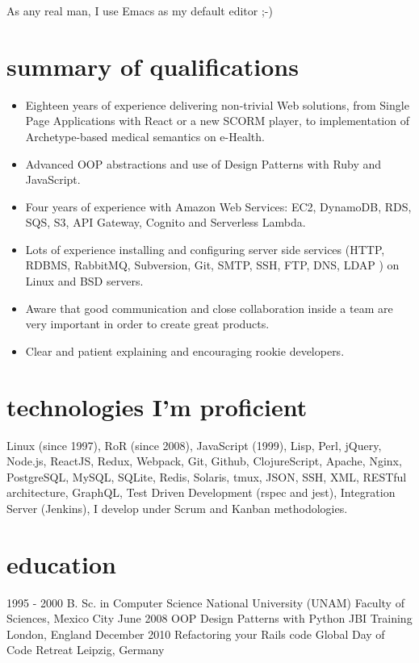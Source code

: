 \documentclass[]{k-cv}
\begin{document}
As any real man, I use Emacs as my default editor ;-)

\section{summary of qualifications}
  \begin{itemize}
    \item Eighteen years of experience delivering non-trivial Web solutions, from Single Page Applications
          with React or a new SCORM player, to implementation of Archetype-based medical semantics on e-Health.
    \item Advanced OOP abstractions and use of Design Patterns with Ruby and JavaScript.
    \item Four years of experience with Amazon Web Services: EC2, DynamoDB, RDS, SQS, S3, API Gateway, Cognito and Serverless Lambda.
    \item Lots of experience installing and configuring server side services (HTTP,
          RDBMS, RabbitMQ, Subversion, Git, SMTP, SSH, FTP, DNS, LDAP ) on Linux and
          BSD servers.
    \item Aware that good communication and close collaboration inside a team
          are very important in order to create great products.
    \item Clear and patient explaining and encouraging rookie developers.
   \end{itemize}

\section{technologies I'm proficient}

    Linux (since 1997), RoR (since 2008), JavaScript (1999), Lisp, Perl, jQuery, Node.js, ReactJS, Redux, Webpack, Git,
    Github, ClojureScript, Apache, Nginx, PostgreSQL, MySQL, SQLite, Redis, Solaris,
    tmux, JSON, SSH, XML, RESTful architecture, GraphQL, Test Driven Development (rspec and jest),
    Integration Server (Jenkins), I develop under Scrum and Kanban methodologies.


\newpage

\section{education}

\begin{entrylist}
  \entry
    {1995 - 2000}
    {B. Sc. in Computer Science}
    {National University (UNAM)}
	  {Faculty of Sciences, Mexico City}
  \entry
    {June 2008}
    {OOP Design Patterns with Python}
    {JBI Training}
    {London, England}
   \entry
    {December 2010}
    {Refactoring your Rails code}
    {Global Day of Code Retreat}
    {Leipzig, Germany}

\end{entrylist}
\end{document}
